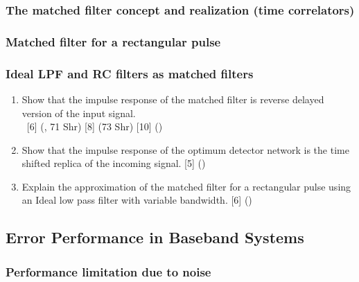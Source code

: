 \documentclass[12pt]{article}
\newcommand{\enter}{\\\textcolor{white}{1}}
\begin{document}
    \subsubsection{The matched filter concept and realization (time correlators)}
    \subsubsection{Matched filter for a rectangular pulse}
    \subsubsection{Ideal LPF and RC filters as matched filters}
      \begin{enumerate}
        \item Show that the impulse response of the matched filter is reverse delayed version of the input signal.
        \enter\hfill [6] (, 71 Shr) [8] (73 Shr) [10] ()
        
        \item Show that the impulse response of the optimum detector network is the time shifted replica of the incoming signal. \hfill [5] ()
        
        \item Explain the approximation of the matched filter for a rectangular pulse using an Ideal low pass filter with variable bandwidth. \hfill [6] ()
      \end{enumerate}

  \subsection{Error Performance in Baseband Systems}
    \subsubsection{Performance limitation due to noise}
\end{document}
